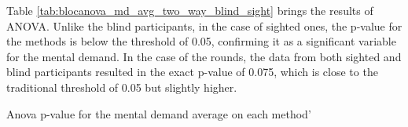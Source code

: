 Table \ref{tab:blocanova_md_avg_two_way_blind_sight} brings the results of ANOVA. Unlike the blind participants, in the case of sighted ones, the p-value for the methods is below the threshold of 0.05, confirming it as a significant variable for the mental demand. In the case of the rounds, the data from both sighted and blind participants resulted in the exact p-value of 0.075, which is close to the traditional threshold of 0.05 but slightly higher. 

\begin{table}[!htb]
    \caption{Anova p-value for the mental demand average on each method'}
    \label{tab:blocanova_md_avg_two_way_blind_sight}
\begin{minipage}{0.45\linewidth}
    
\end{minipage}%
\begin{minipage}{0.05\linewidth}
    \hfill
\end{minipage}%
\begin{minipage}{0.45\linewidth}
        
\end{minipage}
\end{table}



